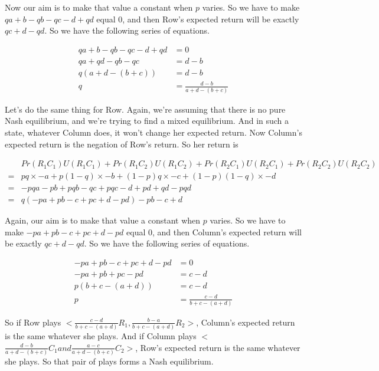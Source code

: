 Now our aim is to make that value a constant when $p$ varies. So we have to make $qa + b - qb - qc -d +qd$ equal 0, and then Row's expected return will be exactly $qc + d - qd$. So we have the following series of equations.

\begin{align*}
qa + b - qb - qc -d +qd &= 0 \\
qa + qd - qb - qc &= d - b \\
q(a + d - (b + c)) &= d - b \\
q &= \frac{d - b}{a + d - (b + c)}
\end{align*}

Let's do the same thing for Row. Again, we're assuming that there is no pure Nash equilibrium, and we're trying to find a mixed equilibrium. And in such a state, whatever Column does, it won't change her expected return. Now Column's expected return is the negation of Row's return. So her return is

\begin{align*}
&Pr(R_1C_1)U(R_1C_1) + Pr(R_1C_2)U(R_1C_2) + Pr(R_2C_1)U(R_2C_1) + Pr(R_2C_2)U(R_2C_2) \\
= &pq \times -a + p(1-q) \times -b + (1-p)q \times -c + (1-p)(1-q) \times -d \\
= &-pqa - pb + pqb - qc + pqc - d + pd + qd - pqd \\ 
= &q(-pa + pb - c + pc + d - pd) -pb - c + d
\end{align*}

Again, our aim is to make that value a constant when $p$ varies. So we have to make $-pa + pb - c + pc + d - pd$ equal 0, and then Column's expected return will be exactly $qc + d - qd$. So we have the following series of equations.

\begin{align*}
-pa + pb - c + pc + d - pd &= 0 \\
-pa + pb + pc - pd &= c - d \\
p(b + c - (a + d)) &= c - d \\
p &= \frac{c - d}{b + c - (a + d)}
\end{align*}

So if Row plays $<$$\frac{c - d}{b + c - (a + d)} R_1, \frac{b - a}{b + c - (a + d)} R_2$$>$, Column's expected return is the same whatever she plays. And if Column plays $<$$\frac{d - b}{a + d - (b + c)} C_1 and \frac{a - c}{a + d - (b + c)}C_2$$>$, Row's expected return is the same whatever she plays. So that pair of plays forms a Nash equilibrium.